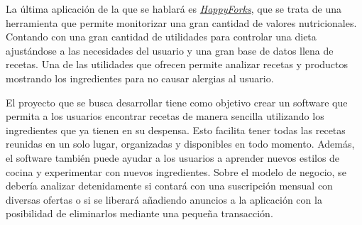 La última aplicación de la que se hablará es \href{https://happyforks.com/}{\emph{HappyForks}}, que se trata de una herramienta que permite monitorizar una gran cantidad de valores nutricionales. Contando con una gran cantidad de utilidades para controlar una dieta ajustándose a las necesidades del usuario y una gran base de datos llena de recetas. Una de las utilidades que ofrecen permite analizar recetas y productos mostrando los ingredientes para no causar alergias al usuario. 

El proyecto que se busca desarrollar tiene como objetivo crear un software que permita a los usuarios encontrar recetas de manera sencilla utilizando los ingredientes que ya tienen en su despensa. Esto facilita tener todas las recetas reunidas en un solo lugar, organizadas y disponibles en todo momento. Además, el software también puede ayudar a los usuarios a aprender nuevos estilos de cocina y experimentar con nuevos ingredientes. Sobre el modelo de negocio, se debería analizar detenidamente si contará con una suscripción mensual con diversas ofertas o si se liberará añadiendo anuncios a la aplicación con la posibilidad de eliminarlos mediante una pequeña transacción. 